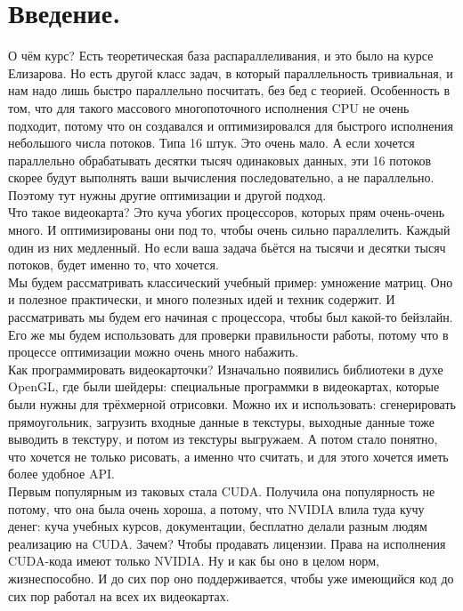 \documentclass{article}
\begin{document}
    \tableofcontents
    \section{Введение.}
    О чём курс? Есть теоретическая база распараллеливания, и это было на курсе Елизарова. Но есть другой класс задач, в который параллельность тривиальная, и нам надо лишь быстро параллельно посчитать, без бед с теорией. Особенность в том, что для такого массового многопоточного исполнения CPU не очень подходит, потому что он создавался и оптимизировался для быстрого исполнения небольшого числа потоков. Типа 16 штук. Это очень мало. А если хочется параллельно обрабатывать десятки тысяч одинаковых данных, эти 16 потоков скорее будут выполнять ваши вычисления последовательно, а не параллельно. Поэтому тут нужны другие оптимизации и другой подход.\\
    Что такое видеокарта? Это куча убогих процессоров, которых прям очень-очень много. И оптимизированы они под то, чтобы очень сильно параллелить. Каждый один из них медленный. Но если ваша задача бьётся на тысячи и десятки тысяч потоков, будет именно то, что хочется.\\
    Мы будем рассматривать классический учебный пример: умножение матриц. Оно и полезное практически, и много полезных идей и техник содержит. И рассматривать мы будем его начиная с процессора, чтобы был какой-то бейзлайн. Его же мы будем использовать для проверки правильности работы, потому что в процессе оптимизации можно очень много набажить.\\
    Как программировать видеокарточки? Изначально появились библиотеки в духе OpenGL, где были шейдеры: специальные программки в видеокартах, которые были нужны для трёхмерной отрисовки. Можно их и использовать: сгенерировать прямоугольник, загрузить входные данные в текстуры, выходные данные тоже выводить в текстуру, и потом из текстуры выгружаем. А потом стало понятно, что хочется не только рисовать, а именно что считать, и для этого хочется иметь более удобное API.\\
    Первым популярным из таковых стала CUDA. Получила она популярность не потому, что она была очень хороша, а потому, что NVIDIA влила туда кучу денег: куча учебных курсов, документации, бесплатно делали разным людям реализацию на CUDA. Зачем? Чтобы продавать лицензии. Права на исполнения CUDA-кода имеют только NVIDIA. Ну и как бы оно в целом норм, жизнеспособно. И до сих пор оно поддерживается, чтобы уже имеющийся код до сих пор работал на всех их видеокартах.\\
\end{document}
